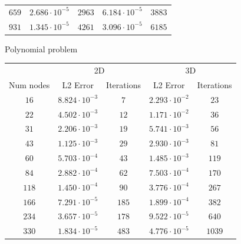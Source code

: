 \begin{table}
\begin{subtable}{\textwidth}
\begin{small}
\begin{tabular}{ccc@{\hskip 1cm}cc}
                \(659\)   &  \(2.686\cdot 10^{-5}\)  & \(2963\)  &  \(6.184\cdot 10^{-5}\) & \(3883\) \\
                \(931\)   &  \(1.345\cdot 10^{-5}\)  & \(4261\)  &  \(3.096\cdot 10^{-5}\) & \(6185\) \\
                \bottomrule
            \end{tabular}
        \end{small}
    \end{subtable}
    \vskip 1cm
    \begin{subtable}{\textwidth}
        \centering
        \begin{Large}
            Polynomial problem
        \end{Large}
        \begin{small}
            \begin{tabular}{ccc@{\hskip 1cm}cc}
                \toprule
                & \multicolumn{2}{c}{2D\hphantom{asdf}} & \multicolumn{2}{c}{3D} \\
                Num nodes & L2 Error & Iterations & L2 Error & Iterations \\
                \cmidrule(lr{1cm}){2-3}\cmidrule(r){4-5}
                \( 16\)   &  \(8.824\cdot 10^{-3}\)  & \(   7\)  &  \(2.293\cdot 10^{-2}\) & \(  23\) \\
                \( 22\)   &  \(4.502\cdot 10^{-3}\)  & \(  12\)  &  \(1.171\cdot 10^{-2}\) & \(  36\) \\
                \( 31\)   &  \(2.206\cdot 10^{-3}\)  & \(  19\)  &  \(5.741\cdot 10^{-3}\) & \(  56\) \\
                \( 43\)   &  \(1.125\cdot 10^{-3}\)  & \(  29\)  &  \(2.930\cdot 10^{-3}\) & \(  81\) \\
                \( 60\)   &  \(5.703\cdot 10^{-4}\)  & \(  43\)  &  \(1.485\cdot 10^{-3}\) & \( 119\) \\
                \( 84\)   &  \(2.882\cdot 10^{-4}\)  & \(  62\)  &  \(7.503\cdot 10^{-4}\) & \( 170\) \\
                \(118\)   &  \(1.450\cdot 10^{-4}\)  & \(  90\)  &  \(3.776\cdot 10^{-4}\) & \( 267\) \\
                \(166\)   &  \(7.291\cdot 10^{-5}\)  & \( 185\)  &  \(1.899\cdot 10^{-4}\) & \( 382\) \\
                \(234\)   &  \(3.657\cdot 10^{-5}\)  & \( 178\)  &  \(9.522\cdot 10^{-5}\) & \( 640\) \\
                \(330\)   &  \(1.834\cdot 10^{-5}\)  & \( 483\)  &  \(4.776\cdot 10^{-5}\) & \(1039\) \\

\end{tabular}
\end{small}
\end{subtable}
\end{table}
